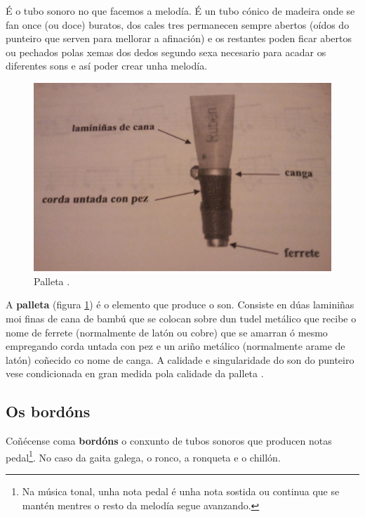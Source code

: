  É o tubo sonoro no que facemos a melodía. É un tubo cónico de madeira onde se
 fan once (ou doce) buratos, dos cales tres permanecen sempre abertos (oídos do
 punteiro que serven para mellorar a afinación) e os restantes poden ficar
 abertos ou pechados polas xemas dos dedos segundo sexa necesario para acadar
 os diferentes sons e así poder crear unha melodía. \\

 \begin{figure}[htbp]
 \centering
 \includegraphics[scale=0.1,keepaspectratio=true]{./imagenes/bruno-villamor-palleta.jpg}
 \caption[Palleta]{Palleta \cite{BrunoVillamorCaderno15}.}
 \label{figura:BrunoVillamorPalleta}
\end{figure}

 A \textbf{palleta} (figura \ref{figura:BrunoVillamorPalleta}) é o elemento que
 produce o son. Consiste en dúas laminiñas moi finas de cana de bambú que se
 colocan sobre dun tudel metálico que recibe o nome de ferrete (normalmente de
 latón ou cobre) que se amarran ó mesmo empregando corda untada con pez e un
 ariño metálico (normalmente arame de latón) coñecido co nome de canga. A
 calidade e singularidade do son do punteiro vese condicionada en gran medida
 pola calidade da palleta \cite{BrunoVillamorCaderno15}.

 \subsection{Os bordóns}

 Coñécense coma \textbf{bordóns} o conxunto de tubos sonoros que producen notas
 pedal\footnote{Na música tonal, unha nota pedal é unha nota sostida ou
 continua que se mantén mentres o resto da melodía segue avanzando.}. No caso
 da gaita galega, o ronco, a ronqueta e o chillón. \\

